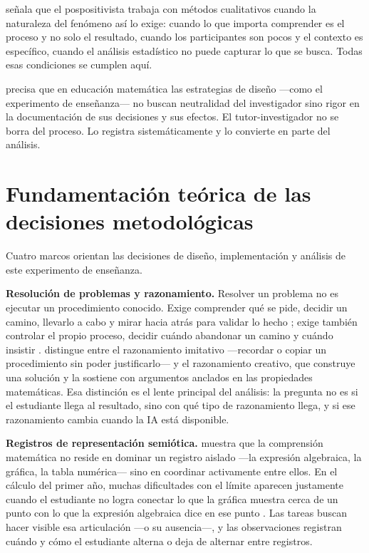 \textcite{creswell2014research} señala que el pospositivista trabaja con métodos cualitativos cuando la naturaleza del fenómeno así lo exige: cuando lo que importa comprender es el proceso y no solo el resultado, cuando los participantes son pocos y el contexto es específico, cuando el análisis estadístico no puede capturar lo que se busca. Todas esas condiciones se cumplen aquí.

\textcite{camargoConferenciaInteramericanaEducacion10} precisa que en educación matemática las estrategias de diseño ---como el experimento de enseñanza--- no buscan neutralidad del investigador sino rigor en la documentación de sus decisiones y sus efectos. El tutor-investigador no se borra del proceso. Lo registra sistemáticamente y lo convierte en parte del análisis.

\section{Fundamentación teórica de las decisiones metodológicas}

Cuatro marcos orientan las decisiones de diseño, implementación y análisis de este experimento de enseñanza.

\textbf{Resolución de problemas y razonamiento.} Resolver un problema no es ejecutar un procedimiento conocido. Exige comprender qué se pide, decidir un camino, llevarlo a cabo y mirar hacia atrás para validar lo hecho \parencite{polya1945how}; exige también controlar el propio proceso, decidir cuándo abandonar un camino y cuándo insistir \parencite{schoenfeld1985mathematical}. \textcite{lithner2008framework} distingue entre el razonamiento imitativo ---recordar o copiar un procedimiento sin poder justificarlo--- y el razonamiento creativo, que construye una solución y la sostiene con argumentos anclados en las propiedades matemáticas. Esa distinción es el lente principal del análisis: la pregunta no es si el estudiante llega al resultado, sino con qué tipo de razonamiento llega, y si ese razonamiento cambia cuando la IA está disponible.

\textbf{Registros de representación semiótica.} \textcite{duval2006} muestra que la comprensión matemática no reside en dominar un registro aislado ---la expresión algebraica, la gráfica, la tabla numérica--- sino en coordinar activamente entre ellos. En el cálculo del primer año, muchas dificultades con el límite aparecen justamente cuando el estudiante no logra conectar lo que la gráfica muestra cerca de un punto con lo que la expresión algebraica dice en ese punto \parencite{vandebrouck2021task}. Las tareas buscan hacer visible esa articulación ---o su ausencia---, y las observaciones registran cuándo y cómo el estudiante alterna o deja de alternar entre registros.

